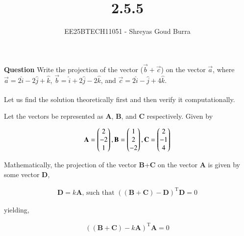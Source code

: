 \documentclass[journal]{IEEEtran}
\begin{document}

\vspace{3cm}

\title{2.5.5}
\author{EE25BTECH11051 - Shreyas Goud Burra}
\maketitle
{\let\newpage\relax\maketitle}

\renewcommand{\thefigure}{\theenumi}
\renewcommand{\thetable}{\theenumi}
\setlength{\intextsep}{10pt} %


\renewcommand{\thetable}{\theenumi}

\textbf{Question}
Write the projection of the vector ($\vec{b} + \vec{c}$) on the vector $\vec{a}$, where $\vec{a} = 2\hat{i}-2\hat{j}+\hat{k}$, $\vec{b} = \hat{i}+2\hat{j}-2\hat{k}$, and $\vec{c} = 2\hat{i}-\hat{j}+4\hat{k}$.\\

\solution\\

Let us find the solution theoretically first and then verify it computationally.

Let the vectors be represented as \textbf{A}, \textbf{B}, and \textbf{C} respectively. Given by

\begin{align}
    \textbf{A} = \begin{pmatrix}2 \\ -2 \\ 1\end{pmatrix}, \textbf{B} = \begin{pmatrix}1 \\ 2\\ -2\end{pmatrix}, \textbf{C} = \begin{pmatrix}2\\-1\\4\end{pmatrix}
    \label{0.1}
\end{align}

Mathematically, the projection of the vector \textbf{B}+\textbf{C} on the vector \textbf{A} is given by some vector \textbf{D},

\begin{align}
    \textbf{D} = k\textbf{A}\text{, such that } ((\textbf{B}+\textbf{C})-\textbf{D})^\text{T}\textbf{D}=0
    \label{0.2}
\end{align}

yielding,

\begin{align}
    ((\textbf{B}+\textbf{C})-k\textbf{A})^\text{T}\textbf{A}=0
    \label{0.3}
\end{align}
\end{document}
